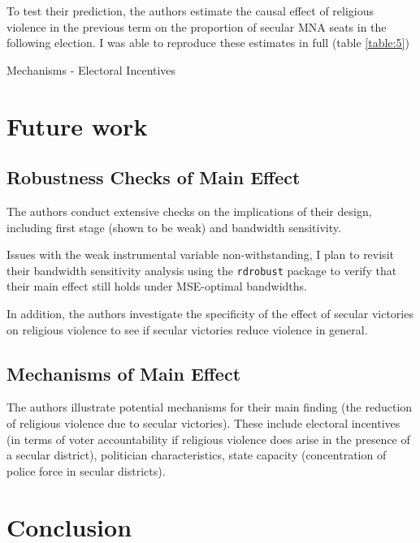 \documentclass{scrartcl}
\begin{document}
To test their prediction, the authors estimate the causal effect of religious violence in the previous term on the proportion of secular MNA seats in the following election.
I was able to reproduce these estimates in full (table \ref{table:5})

\begin{table}[ht]
  \begin{center}
    \scalebox{0.75}{
      
    }
    \caption{Mechanisms - Electoral Incentives}
    \label{table:5}
  \end{center}
\end{table}


\section{Future work}

\subsection{Robustness Checks of Main Effect}

The authors conduct extensive checks on the implications of their design, including first stage (shown to be weak) and bandwidth sensitivity. 

Issues with the weak instrumental variable non-withstanding, I plan to revisit their bandwidth sensitivity analysis using the \texttt{rdrobust} package to verify that their main effect still holds under MSE-optimal bandwidths.

In addition, the authors investigate the specificity of the effect of secular victories on religious violence to see if secular victories reduce violence in general. 

\subsection{Mechanisms of Main Effect}

The authors illustrate potential mechanisms for their main finding (the reduction of religious violence due to secular victories). These include electoral incentives (in terms of voter accountability if religious violence does arise in the presence of a secular district), politician characteristics, state capacity (concentration of police force in secular districts).

\section{Conclusion}
\end{document}

